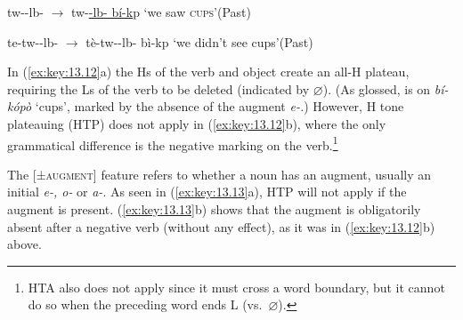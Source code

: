 \documentclass[output=paper]{langsci/langscibook}
\begin{document}
\ea\label{ex:key:13.12}
    \ea tw--lb-  ${\rightarrow}$
        tw-\underline{-lb-
        bí-k}p  ‘we saw \textsc{cups}’\hfill(Past)
        \vspace{.75\baselineskip}
    \ex te-tw--lb-  ${\rightarrow}$
        tè-tw--lb-  bì-kp
        ‘we didn’t see cups’\hfill(Past)
        \vspace{.75\baselineskip}
    \z
\z
In (\ref{ex:key:13.12}a) the Hs of the verb and object create an all-H plateau,
requiring the Ls of the verb to be deleted (indicated by $\varnothing$). (As
glossed, 
is on \emph{bí-kópò} ‘cups’, marked by the absence of the augment \emph{e-.})
However, H tone plateauing (\gls{HTP}) does not apply in
(\ref{ex:key:13.12}b), where the only grammatical difference is the negative
marking on the verb.\footnote{\gls{HTA} also does not apply since it must cross
a word boundary, but it cannot do so when the preceding word ends L (vs.\ $\varnothing$).}

The [±\textsc{augment}] feature refers to whether a noun has an augment,
usually an initial \emph{e-, o-} or \emph{a-}. As seen in
(\ref{ex:key:13.13}a), \gls{HTP} will not apply if the augment is present.
(\ref{ex:key:13.13}b) shows that the augment is obligatorily absent after a
negative verb (without any  effect), as it was in (\ref{ex:key:13.12}b)
above.
\end{document}
